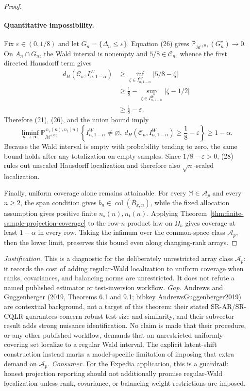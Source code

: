 \documentclass{article}
\begin{document}
\begin{proof}
\paragraph{Quantitative impossibility.}
Fix \(\varepsilon\in(0,1/8)\) and let \(G_n=\{\Delta_n\le\varepsilon\}\). Equation (26) gives \(\mathbb P_{\mathcal M^{(0)}}(G_n^c)\to0\). On \(A_n\cap G_n\), the Wald interval is nonempty and \(5/8\in\mathcal C_n\), whence the first directed Hausdorff term gives
\[
\begin{aligned}
d_H(\mathcal C_n,I^W_{n,1-\alpha})
&\ge\inf_{\zeta\in I^W_{n,1-\alpha}}|5/8-\zeta|\\
&\ge\frac18-\sup_{\zeta\in I^W_{n,1-\alpha}}|\zeta-1/2|\\
&\ge\frac18-\varepsilon.
\end{aligned}
\tag{27}
\]
Therefore (21), (26), and the union bound imply
\[
\liminf_{n\to\infty}
\mathbb P_{\mathcal M^{(0)}}^{\,n_s(n),n_t(n)}
\left\{I^W_{n,1-\alpha}\ne\varnothing,\ 
d_H(\mathcal C_n,I^W_{n,1-\alpha})\ge\frac18-\varepsilon\right\}
\ge1-\alpha.
\tag{28}
\]
Because the Wald interval is empty with probability tending to zero, the same bound holds after any totalization on empty samples. Since \(1/8-\varepsilon>0\), (28) rules out unscaled Hausdorff localization and therefore also \(\sqrt n\)-scaled localization.

Finally, uniform coverage alone remains attainable. For every \(\mathbb M\in\mathcal A_p\) and every \(n\ge2\), the span condition gives \(b_n\in\operatorname{col}(B_{x,n})\), while the fixed allocation assumption gives positive finite \(n_s(n),n_t(n)\). Applying Theorem~\ref{thm:finite-sample-projection-coverage} to the row-\(n\) product law on \(\Omega_n\) gives coverage at least \(1-\alpha\) in every row. Taking the infimum over the common-space class \(\mathcal A_p\), then the lower limit, preserves this bound even along changing-rank arrays.
\end{proof}
\par\smallskip\noindent \textit{Justification.} This is a diagnostic for the deliberately unrestricted array class \(\mathcal A_p\): it records the cost of adding regular-Wald localization to uniform coverage when ranks, covariances, and balancing norms are unrestricted. It does not refute a named published estimator or test-inversion workflow. \textit{Gap.} Andrews and Guggenberger (2019, Theorems 6.1 and 9.1; bibkey AndrewsGuggenberger2019) are contextual background, not a target of this theorem: their stated SR-AR/SR-CQLR guarantees concern robust-test size and similarity, and their subvector result adds strong nuisance identification. No claim is made that their procedure, or any other published workflow, demands that an unrestricted uniformly covering set localize to a regular Wald interval. The explicit latent-shift construction instead marks a model-specific limitation of imposing that extra demand on \(\mathcal A_p\). \textit{Consumer.} For the Expedia application, this is a guardrail: honest projection reporting should not additionally promise regular-Wald localization unless rank, covariance, or balancing-weight restrictions are imposed.
\end{document}

